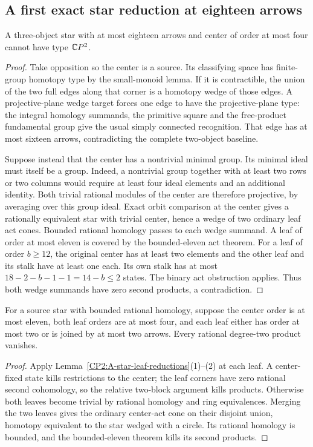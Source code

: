 \subsection{A first exact star reduction at eighteen arrows}

\begin{proposition}
\label{CP2:A-star-small-center-eighteen}
A three-object star with at most eighteen arrows and center
of order at most four cannot have type $\mathbb{C}P^2$.
\end{proposition}
\begin{proof}
Take opposition so the center is a source. Its classifying
space has finite-group homotopy type by the small-monoid
lemma. If it is contractible, the union of the two full
edges along that corner is a homotopy wedge of those edges.
A projective-plane wedge target forces one edge to have
the projective-plane type: the integral homology summands,
the primitive square and the free-product fundamental
group give the usual simply connected recognition.
That edge has at most sixteen arrows, contradicting the
complete two-object baseline.

Suppose instead that the center has a nontrivial minimal
group. Its minimal ideal must itself be a group. Indeed,
a nontrivial group together with at least two rows or
two columns would require at least four ideal elements
and an additional identity. Both trivial rational modules
of the center are therefore projective, by averaging
over this group ideal. Exact orbit comparison at the
center gives a rationally equivalent star with trivial
center, hence a wedge of two ordinary leaf act cones.
Bounded rational homology passes to each wedge summand.
A leaf of order at most eleven is covered by the
bounded-eleven act theorem. For a leaf of order $b\ge12$,
the original center has at least two elements and the
other leaf and its stalk have at least one each. Its
own stalk has at most $18-2-b-1-1=14-b\le2$ states.
The binary act obstruction applies. Thus both wedge
summands have zero second products, a contradiction.
\end{proof}

\begin{corollary}
\label{CP2:A-star-leaves-bounded-eleven}
For a source star with bounded rational homology, suppose
the center order is at most eleven, both leaf orders
are at most four, and each leaf either has order at
most two or is joined by at most two arrows.
Every rational degree-two product vanishes.
\end{corollary}
\begin{proof}
Apply Lemma~\ref{CP2:A-star-leaf-reductions}(1)--(2)
at each leaf. A center-fixed state kills restrictions
to the center; the leaf corners have zero rational
second cohomology, so the relative two-block argument
kills products. Otherwise both leaves become trivial
by rational homology and ring equivalences. Merging
the two leaves gives the ordinary center-act cone on
their disjoint union, homotopy equivalent to the star
wedged with a circle. Its rational homology is bounded,
and the bounded-eleven theorem kills its second products.
\end{proof}

